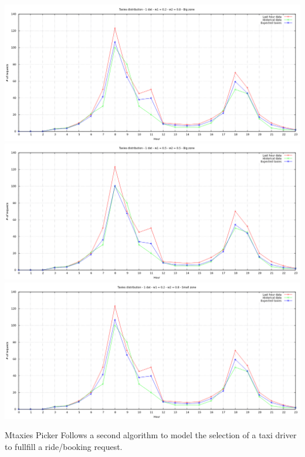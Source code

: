 \documentclass[11pt,titlepage]{article} %
\newenvironment{changemargin}[3]{%
\begin{list}{}{%
\setlength{\topsep}{0pt}%
\setlength{\headsep}{#3}%
\setlength{\leftmargin}{#1}%
\setlength{\rightmargin}{#2}%
\setlength{\listparindent}{\parindent}%
\setlength{\itemindent}{\parindent}%
\setlength{\parsep}{\parskip}%
}%
\item[]}{\end{list}}
\begin{document}
\begin{changemargin}{-2cm}{0cm}{0cm}
	\includegraphics[scale=0.5]{graph1.png}
	\includegraphics[scale=0.5]{graph2.png}
	\includegraphics[scale=0.5]{graph3.png}
\end{changemargin}
\newpage
Mtaxies Picker
\noindent Follows a second algorithm to model the selection of a taxi driver to fullfill a ride/booking request.\newline
\end{document}
